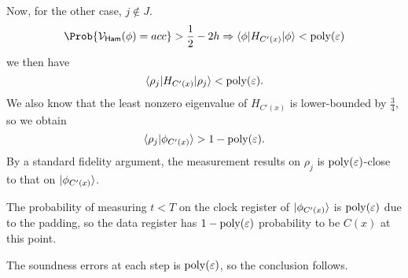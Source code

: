 \begin{prf}
	Now, for the other case, $j\notin J$.
	$$\Prob{\cV_\GS(\phi)=acc}>\frac{1}{2}-2h\Rightarrow\braket{\phi|H_{C'(x)}|\phi}<\poly(\varepsilon)$$
	we then have
	$$\braket{\rho_j|H_{C'(x)}|\rho_j}<\operatorname*{\operatorname{poly}}(\varepsilon).$$
	We also know that the least nonzero eigenvalue of $H_{C'(x)}$ is lower-bounded by $\frac{3}{4}$, so we obtain
	$$\braket{\rho_j|\phi_{C'(x)}}>1-\operatorname*{\operatorname{poly}}(\varepsilon).$$
	By a standard fidelity argument, the measurement results on $\rho_j$ is $\operatorname*{\operatorname{poly}}(\varepsilon)$-close to that on $\ket{\phi_{C'(x)}}$.

	The probability of measuring $t<T$ on the clock register of $\ket{\phi_{C'(x)}}$ is $\operatorname*{\operatorname{poly}}(\varepsilon)$ due to the padding,
	so the data register has $1-\operatorname*{\operatorname{poly}}(\varepsilon)$ probability to be $C(x)$ at this point.

	The soundness errors at each step is $\operatorname*{\operatorname{poly}}(\varepsilon)$, so the conclusion follows.
\end{prf}
